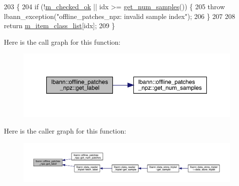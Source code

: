 \begin{DoxyCode}
203                                                                                 \{
204   \textcolor{keywordflow}{if} (!\hyperlink{classlbann_1_1offline__patches__npz_ab434320c2084790a2c99257d6c39fc85}{m\_checked\_ok} || idx >= \hyperlink{classlbann_1_1offline__patches__npz_aa6fa05575f54a29b67d0bba8a2a9d363}{get\_num\_samples}()) \{
205     \textcolor{keywordflow}{throw} lbann\_exception(\textcolor{stringliteral}{"offline\_patches\_npz: invalid sample index"});
206   \}
207 
208   \textcolor{keywordflow}{return} \hyperlink{classlbann_1_1offline__patches__npz_a5f90dc1b898f8ad9d7ea16c188738419}{m\_item\_class\_list}[idx];
209 \}
\end{DoxyCode}
Here is the call graph for this function\+:\nopagebreak
\begin{figure}[H]
\begin{center}
\leavevmode
\includegraphics[width=350pt]{classlbann_1_1offline__patches__npz_a7548019f8e7f768027b50d497c4e6e73_cgraph}
\end{center}
\end{figure}
Here is the caller graph for this function\+:\nopagebreak
\begin{figure}[H]
\begin{center}
\leavevmode
\includegraphics[width=350pt]{classlbann_1_1offline__patches__npz_a7548019f8e7f768027b50d497c4e6e73_icgraph}
\end{center}
\end{figure}
\mbox{\label{classlbann_1_1offline__patches__npz_a153f67de70844a6820aa472f91a6245e}} 
